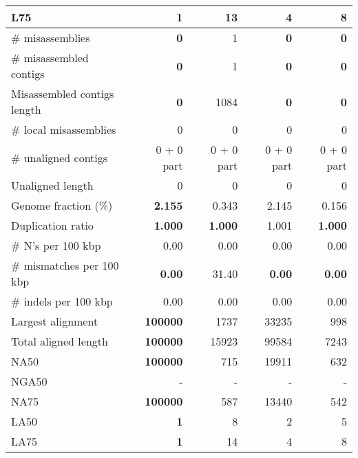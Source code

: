 \documentclass[12pt,a4paper]{article}
\begin{document}
\begin{table}[ht]
\begin{center}
\begin{tabular}{|l*{4}{|r}|}
L75 & {\bf 1} & 13 & 4 & 8 \\ \hline
\# misassemblies & {\bf 0} & 1 & {\bf 0} & {\bf 0} \\ \hline
\# misassembled contigs & {\bf 0} & 1 & {\bf 0} & {\bf 0} \\ \hline
Misassembled contigs length & {\bf 0} & 1084 & {\bf 0} & {\bf 0} \\ \hline
\# local misassemblies & 0 & 0 & 0 & 0 \\ \hline
\# unaligned contigs & 0 + 0 part & 0 + 0 part & 0 + 0 part & 0 + 0 part \\ \hline
Unaligned length & 0 & 0 & 0 & 0 \\ \hline
Genome fraction (\%) & {\bf 2.155} & 0.343 & 2.145 & 0.156 \\ \hline
Duplication ratio & {\bf 1.000} & {\bf 1.000} & 1.001 & {\bf 1.000} \\ \hline
\# N's per 100 kbp & 0.00 & 0.00 & 0.00 & 0.00 \\ \hline
\# mismatches per 100 kbp & {\bf 0.00} & 31.40 & {\bf 0.00} & {\bf 0.00} \\ \hline
\# indels per 100 kbp & 0.00 & 0.00 & 0.00 & 0.00 \\ \hline
Largest alignment & {\bf 100000} & 1737 & 33235 & 998 \\ \hline
Total aligned length & {\bf 100000} & 15923 & 99584 & 7243 \\ \hline
NA50 & {\bf 100000} & 715 & 19911 & 632 \\ \hline
NGA50 & - & - & - & - \\ \hline
NA75 & {\bf 100000} & 587 & 13440 & 542 \\ \hline
LA50 & {\bf 1} & 8 & 2 & 5 \\ \hline
LA75 & {\bf 1} & 14 & 4 & 8 \\ \hline
\end{tabular}
\end{center}
\end{table}
\end{document}
